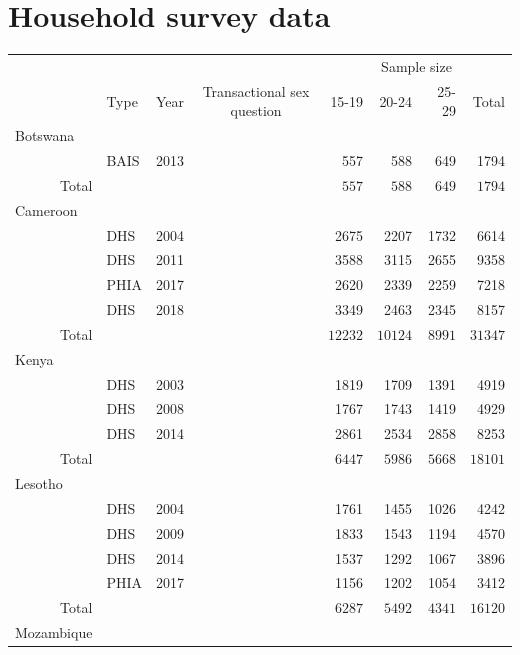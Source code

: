 \documentclass[a4paper, nobind]{templates/ociamthesis}
\newcommand{\cmark}{\ding{51}}
\newcommand{\xmark}{\ding{55}}
\begin{document}
\hypertarget{household-survey-data}{%
\section{Household survey data}\label{household-survey-data}}

\begin{longtable}{rlrcrrrr}
\toprule
\multicolumn{1}{l}{} &  &  &  & \multicolumn{4}{c}{Sample size} \\ 
\cmidrule(lr){5-8}
\multicolumn{1}{l}{} & Type & Year & Transactional sex question & 15-19 & 20-24 & 25-29 & Total \\ 
\midrule
\multicolumn{1}{l}{Botswana} \\ 
\midrule
 & BAIS & 2013 & \cmark & 557 & 588 & 649 & 1794 \\ 
Total &  &  &  & $557$ & $588$ & $649$ & $1794$ \\ 
\midrule
\multicolumn{1}{l}{Cameroon} \\ 
\midrule
 & DHS & 2004 & \xmark & 2675 & 2207 & 1732 & 6614 \\ 
 & DHS & 2011 & \xmark & 3588 & 3115 & 2655 & 9358 \\ 
 & PHIA & 2017 & \xmark & 2620 & 2339 & 2259 & 7218 \\ 
 & DHS & 2018 & \cmark & 3349 & 2463 & 2345 & 8157 \\ 
Total &  &  &  & $12232$ & $10124$ & $8991$ & $31347$ \\ 
\midrule
\multicolumn{1}{l}{Kenya} \\ 
\midrule
 & DHS & 2003 & \xmark & 1819 & 1709 & 1391 & 4919 \\ 
 & DHS & 2008 & \xmark & 1767 & 1743 & 1419 & 4929 \\ 
 & DHS & 2014 & \xmark & 2861 & 2534 & 2858 & 8253 \\ 
Total &  &  &  & $6447$ & $5986$ & $5668$ & $18101$ \\ 
\midrule
\multicolumn{1}{l}{Lesotho} \\ 
\midrule
 & DHS & 2004 & \xmark & 1761 & 1455 & 1026 & 4242 \\ 
 & DHS & 2009 & \xmark & 1833 & 1543 & 1194 & 4570 \\ 
 & DHS & 2014 & \xmark & 1537 & 1292 & 1067 & 3896 \\ 
 & PHIA & 2017 & \cmark & 1156 & 1202 & 1054 & 3412 \\ 
Total &  &  &  & $6287$ & $5492$ & $4341$ & $16120$ \\ 
\midrule
\multicolumn{1}{l}{Mozambique} \\ 

\end{longtable}
\end{document}
